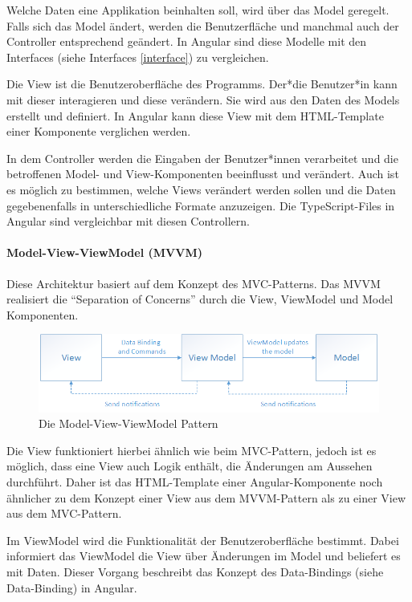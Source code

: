 Welche Daten eine Applikation beinhalten soll, wird über das Model geregelt. Falls sich das Model ändert, werden die Benutzerfläche und manchmal auch der Controller entsprechend geändert. In Angular sind diese Modelle mit den Interfaces (siehe Interfaces \ref{interface})  zu vergleichen.

Die View ist die Benutzeroberfläche des Programms. Der*die Benutzer*in kann mit dieser interagieren und diese verändern. Sie wird aus den Daten des Models erstellt und definiert. In Angular kann diese View mit dem HTML-Template einer Komponente verglichen werden.

In dem Controller werden die Eingaben der Benutzer*innen verarbeitet und die betroffenen Model- und View-Komponenten beeinflusst und verändert. Auch ist es möglich zu bestimmen, welche Views verändert werden sollen und die Daten gegebenenfalls in unterschiedliche Formate anzuzeigen. Die TypeScript-Files in Angular sind vergleichbar mit diesen Controllern.
\cite{MVC}

\paragraph{Model-View-ViewModel (MVVM)}
Diese Architektur basiert auf dem Konzept des MVC-Patterns. Das MVVM realisiert die “Separation of Concerns” durch die View, ViewModel und Model Komponenten.

\begin{figure} [h t]
  \centering
  \includegraphics[scale=0.5]{pics/mvvm-pattern.png}
  \caption{Die Model-View-ViewModel Pattern \cite{MVVM}}
  \label{fig:tech:front:mvc-architecture}
\end{figure}

Die View funktioniert hierbei ähnlich wie beim MVC-Pattern, jedoch ist es möglich, dass eine View auch Logik enthält, die Änderungen am Aussehen durchführt. Daher ist das HTML-Template einer Angular-Komponente noch ähnlicher zu dem Konzept einer View aus dem MVVM-Pattern als zu einer View aus dem MVC-Pattern. 

Im ViewModel wird die Funktionalität der Benutzeroberfläche bestimmt. Dabei informiert das ViewModel die View über Änderungen im Model und beliefert es mit Daten. Dieser Vorgang beschreibt das Konzept des Data-Bindings (siehe Data-Binding) in Angular.  

